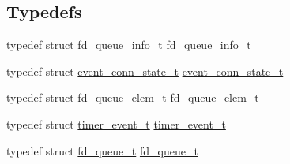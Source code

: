\subsection*{Typedefs}
\begin{DoxyCompactItemize}
\item 
typedef struct \hyperlink{structfd__queue__info__t}{fd\+\_\+queue\+\_\+info\+\_\+t} \hyperlink{group__APACHE__MPM__EVENT_gae60bd20f632fdf018c59af8943651458}{fd\+\_\+queue\+\_\+info\+\_\+t}
\item 
typedef struct \hyperlink{structevent__conn__state__t}{event\+\_\+conn\+\_\+state\+\_\+t} \hyperlink{group__APACHE__MPM__EVENT_ga58fdee464d43137837b98e9009534343}{event\+\_\+conn\+\_\+state\+\_\+t}
\item 
typedef struct \hyperlink{structfd__queue__elem__t}{fd\+\_\+queue\+\_\+elem\+\_\+t} \hyperlink{group__APACHE__MPM__EVENT_ga05898396eb6f09bf84cdf03f6c4bea00}{fd\+\_\+queue\+\_\+elem\+\_\+t}
\item 
typedef struct \hyperlink{structtimer__event__t}{timer\+\_\+event\+\_\+t} \hyperlink{group__APACHE__MPM__EVENT_ga6f734427176866b66f098c2627784243}{timer\+\_\+event\+\_\+t}
\item 
typedef struct \hyperlink{structfd__queue__t}{fd\+\_\+queue\+\_\+t} \hyperlink{group__APACHE__MPM__EVENT_gaecd41846d40f5570725f5cd670a3181b}{fd\+\_\+queue\+\_\+t}
\end{DoxyCompactItemize}
